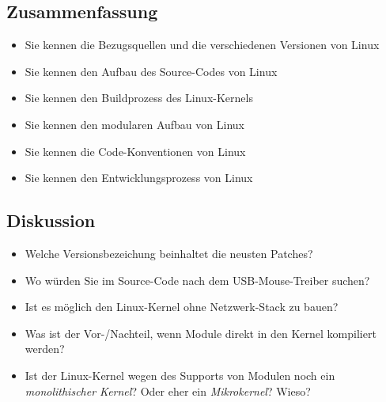 \subsection{Zusammenfassung}
\begin{itemize}
   \item Sie kennen die Bezugsquellen und die verschiedenen Versionen von Linux
   \item Sie kennen den Aufbau des Source-Codes von Linux
   \item Sie kennen den Buildprozess des Linux-Kernels
   \item Sie kennen den modularen Aufbau von Linux
   \item Sie kennen die Code-Konventionen von Linux
   \item Sie kennen den Entwicklungsprozess von Linux
\end{itemize}


\subsection{Diskussion}

\begin{itemize}
   \item Welche Versionsbezeichung beinhaltet die neusten Patches? 
   \item Wo würden Sie im Source-Code nach dem USB-Mouse-Treiber suchen?
   \item Ist es möglich den Linux-Kernel ohne Netzwerk-Stack zu bauen?
   \item Was ist der Vor-/Nachteil, wenn Module direkt in den Kernel kompiliert werden?
   \item Ist der Linux-Kernel wegen des Supports von Modulen noch ein \emph{monolithischer Kernel}? 
         Oder eher ein \emph{Mikrokernel}? Wieso?
\end{itemize}
